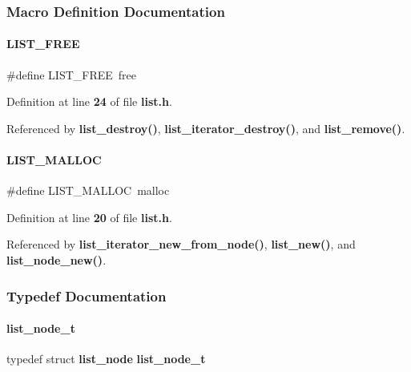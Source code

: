 \subsubsection{Macro Definition Documentation}
\mbox{\label{list_8h_a8968cfdd1e3404352d2c43dcb3bde04a}} 
\paragraph{L\+I\+S\+T\+\_\+\+F\+R\+EE}
{\footnotesize\ttfamily \#define L\+I\+S\+T\+\_\+\+F\+R\+EE~free}



Definition at line \textbf{ 24} of file \textbf{ list.\+h}.



Referenced by \textbf{ list\+\_\+destroy()}, \textbf{ list\+\_\+iterator\+\_\+destroy()}, and \textbf{ list\+\_\+remove()}.

\mbox{\label{list_8h_ab80cb68ecaaf76c970758cd702641cee}} 
\paragraph{L\+I\+S\+T\+\_\+\+M\+A\+L\+L\+OC}
{\footnotesize\ttfamily \#define L\+I\+S\+T\+\_\+\+M\+A\+L\+L\+OC~malloc}



Definition at line \textbf{ 20} of file \textbf{ list.\+h}.



Referenced by \textbf{ list\+\_\+iterator\+\_\+new\+\_\+from\+\_\+node()}, \textbf{ list\+\_\+new()}, and \textbf{ list\+\_\+node\+\_\+new()}.



\subsubsection{Typedef Documentation}
\mbox{\label{list_8h_ad8b8636e2e25308b521b32071e849c80}} 
\paragraph{list\+\_\+node\+\_\+t}
{\footnotesize\ttfamily typedef struct \textbf{ list\+\_\+node}  \textbf{ list\+\_\+node\+\_\+t}}



